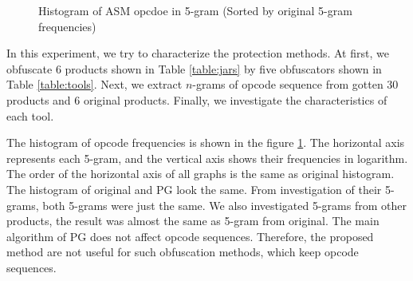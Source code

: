 \documentclass[conference]{IEEEtran}
\begin{document}
\begin{figure}[bt]
\begin{minipage}[b]{0.48\linewidth}
    \label{fig:asm-5gram-PG-histogram}%
  \end{minipage}
  \caption{Histogram of ASM opcdoe in 5-gram (Sorted by original 5-gram frequencies)}
  \label{fig:asm-5gram-histogram}
\end{figure}





In this experiment, we try to characterize the protection methods.  At
first, we obfuscate 6 products shown in Table \ref{table:jars} by five
obfuscators shown in Table \ref{table:tools}.  Next, we extract
$n$-grams of opcode sequence from gotten 30 products and 6 original
products.  Finally, we investigate the characteristics of each tool.

The histogram of opcode frequencies is shown in the figure
\ref{fig:asm-5gram-histogram}.  The horizontal axis represents each
5-gram, and the vertical axis shows their frequencies in logarithm.
The order of the horizontal axis of all graphs is the same as original
histogram.
%
The histogram of original and PG look the same.  From investigation
of their 5-grams, both 5-grams were just the same.  We also
investigated 5-grams from other products, the result was almost the
same as 5-gram from original.  The main algorithm of PG does not
affect opcode sequences.  Therefore, the proposed method are not
useful for such obfuscation methods, which keep opcode sequences.
\end{document}

